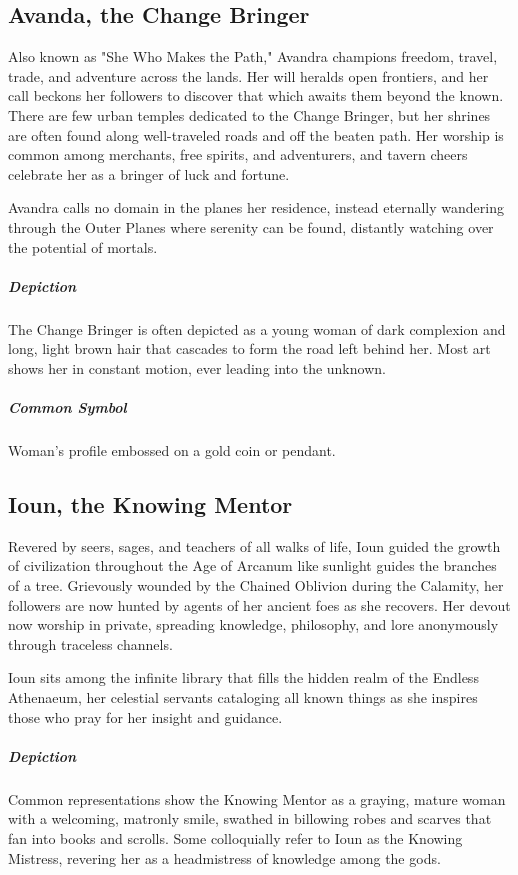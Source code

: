\documentclass[letterpaper,twocolumn,openany,nodeprecatedcode]{dndbook}
\begin{document}
\subsection{Avanda, the Change Bringer}

Also known as "She Who Makes the Path," Avandra champions freedom, travel, trade, and
adventure across the lands. Her will heralds open frontiers, and her call beckons her
followers to discover that which awaits them beyond the known. There are few urban temples
dedicated to the Change Bringer, but her shrines are often found along well-traveled roads
and off the beaten path. Her worship is common among merchants, free spirits, and adventurers,
and tavern cheers celebrate her as a bringer of luck and fortune.

Avandra calls no domain in the planes her residence, instead eternally wandering through the
Outer Planes where serenity can be found, distantly watching over the potential of mortals.

\subparagraph{Depiction}
The Change Bringer is often depicted as a young woman of dark complexion and long, light brown
hair that cascades to form the road left behind her. Most art shows her in constant motion,
ever leading into the unknown.

\subparagraph{Common Symbol}
Woman’s profile embossed on a gold coin or pendant.

\subsection{Ioun, the Knowing Mentor}

Revered by seers, sages, and teachers of all walks of life, Ioun guided the growth of
civilization throughout the Age of Arcanum like sunlight guides the branches of a tree.
Grievously wounded by the Chained Oblivion during the Calamity, her followers are now
hunted by agents of her ancient foes as she recovers. Her devout now worship in private,
spreading knowledge, philosophy, and lore anonymously through traceless channels.

Ioun sits among the infinite library that fills the hidden realm of the Endless Athenaeum,
her celestial servants cataloging all known things as she inspires those who pray for
her insight and guidance.

\subparagraph{Depiction}
Common representations show the Knowing Mentor as a graying, mature woman with a welcoming,
matronly smile, swathed in billowing robes and scarves that fan into books and scrolls.
Some colloquially refer to Ioun as the Knowing Mistress, revering her as a headmistress
of knowledge among the gods.
\end{document}
